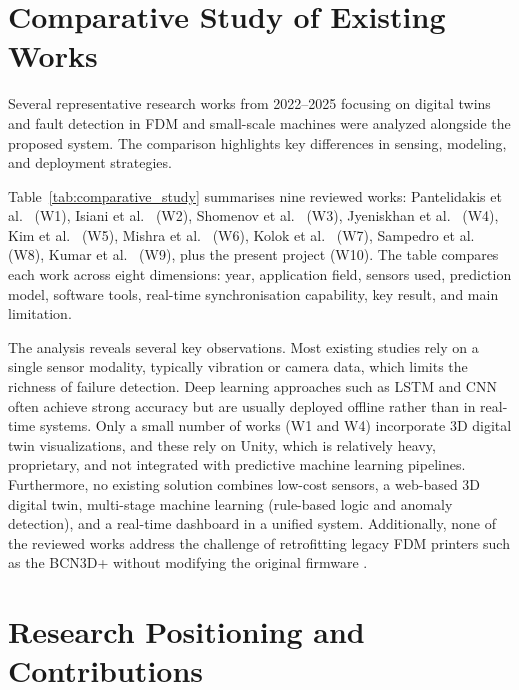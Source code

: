 \section{Comparative Study of Existing Works}

Several representative research works from 2022--2025 focusing on digital twins and fault detection in FDM and small-scale machines were analyzed alongside the proposed system. The comparison highlights key differences in sensing, modeling, and deployment strategies.

Table~\ref{tab:comparative_study} summarises nine reviewed works: Pantelidakis et al.~\cite{pantelidakis2022digital} (W1), Isiani et al.~\cite{isiani2023fault} (W2), Shomenov et al.~\cite{shomenov2025} (W3), Jyeniskhan et al.~\cite{jyeniskhan2023digital} (W4), Kim et al.~\cite{kim2022data} (W5), Mishra et al.~\cite{mishra2023development} (W6), Kolok et al.~\cite{kolok2025lowcost} (W7), Sampedro et al.~\cite{sampedro2022design} (W8), Kumar et al.~\cite{kumar2022lowcost} (W9), plus the present project (W10). The table compares each work across eight dimensions: year, application field, sensors used, prediction model, software tools, real-time synchronisation capability, key result, and main limitation.

{%
    \centering
    \label{tab:comparative_study}
    
}

The analysis reveals several key observations. Most existing studies rely on a single sensor modality, typically vibration or camera data, which limits the richness of failure detection. Deep learning approaches such as LSTM and CNN often achieve strong accuracy but are usually deployed offline rather than in real-time systems. Only a small number of works (W1 and W4) incorporate 3D digital twin visualizations, and these rely on Unity, which is relatively heavy, proprietary, and not integrated with predictive machine learning pipelines. Furthermore, no existing solution combines low-cost sensors, a web-based 3D digital twin, multi-stage machine learning (rule-based logic and anomaly detection), and a real-time dashboard in a unified system. Additionally, none of the reviewed works address the challenge of retrofitting legacy FDM printers such as the BCN3D+ without modifying the original firmware \cite{tudorache2025current,botin2022digital}.

\section{Research Positioning and Contributions}

